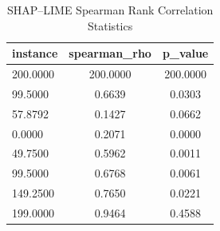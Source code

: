 \begin{table}
\centering
\caption{SHAP–LIME Spearman Rank Correlation Statistics}
\label{tab:agreement}
\begin{tabular}{lcc}
\toprule
instance & spearman_rho & p_value \\
\midrule
200.0000 & 200.0000 & 200.0000 \\
99.5000 & 0.6639 & 0.0303 \\
57.8792 & 0.1427 & 0.0662 \\
0.0000 & 0.2071 & 0.0000 \\
49.7500 & 0.5962 & 0.0011 \\
99.5000 & 0.6768 & 0.0061 \\
149.2500 & 0.7650 & 0.0221 \\
199.0000 & 0.9464 & 0.4588 \\
\bottomrule
\end{tabular}
\end{table}
